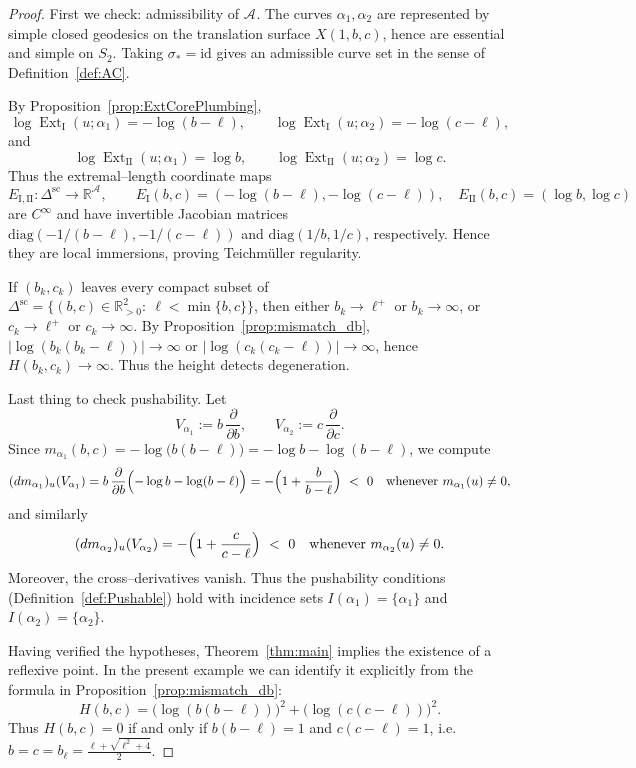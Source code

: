 \documentclass[a4paper,12pt]{amsart}
\newcommand{\R}{\mathbb{R}}
\DeclareMathOperator{\Ext}{Ext}
\newcommand{\id}{\mathrm{id}}
\theoremstyle{plain}
\theoremstyle{definition}
\begin{document}
\begin{proof}
First we check: admissibility of \(\mathcal A_{}\).
The curves \(\alpha_1,\alpha_2\) are represented by simple closed geodesics on the translation surface
\(X(1,b,c)\), hence are essential and simple on \(S_2\).  Taking \(\sigma_\ast=\id\) gives an admissible curve
set in the sense of Definition~\ref{def:AC}.

\smallskip
\noindent

By Proposition~\ref{prop:ExtCorePlumbing},
\[
\log \Ext_{\mathrm{I}}(u;\alpha_1)=-\log(b-\ell),\qquad \log \Ext_{\mathrm{I}}(u;\alpha_2)=-\log(c-\ell),
\]
and
\[
\log \Ext_{\mathrm{II}}(u;\alpha_1)=\log b,\qquad \log \Ext_{\mathrm{II}}(u;\alpha_2)=\log c.
\]
Thus the extremal--length coordinate maps
\[
E_{\mathrm{I, II}}:\Delta^{\mathrm{sc}}_{}\longrightarrow \R^{\mathcal A_{}},
\qquad
E_{\mathrm{I}}(b,c)=(-\log(b-\ell),-\log(c-\ell)),\quad
E_{\mathrm{II}}(b,c)=(\log b,\log c)
\]
are \(C^\infty\) and have invertible Jacobian matrices \(\mathrm{diag}(-1/(b-\ell),-1/(c-\ell))\) and
\(\mathrm{diag}(1/b,1/c)\), respectively.
Hence they are local immersions, proving Teichm\"uller regularity.


\smallskip
\noindent

If \((b_k,c_k)\) leaves every compact subset of \(\Delta^{\mathrm{sc}}_{}=\{(b,c)\in\R_{>0}^2:\ \ell<\min\{b,c\}\}\),
then either \(b_k\longrightarrow \ell^+\) or \(b_k\longrightarrow\infty\), or \(c_k\longrightarrow \ell^+\) or \(c_k\longrightarrow\infty\).
By Proposition~\ref{prop:mismatch_db}, \(\bigl|\log(b_k(b_k-\ell))\bigr|\longrightarrow\infty\) or \(\bigl|\log(c_k(c_k-\ell))\bigr|\longrightarrow\infty\),
hence \(H(b_k,c_k)\longrightarrow\infty\).  Thus the height detects degeneration.

\smallskip
\noindent
Last thing to check pushability. Let
\[
V_{\alpha_1}:=b\,\frac{\partial}{\partial b},
\qquad
V_{\alpha_2}:=c\,\frac{\partial}{\partial c}.
\]
Since \(m_{\alpha_1}(b,c)=-\log\bigl(b(b-\ell)\bigr)=-\log b-\log(b-\ell)\), we compute
\[
(dm_{\alpha_1})_u(V_{\alpha_1})=b\,\frac{\partial}{\partial b}\Bigl(-\log b-\log(b-\ell)\Bigr)
= -\Bigl(1+\frac{b}{b-\ell}\Bigr)\ <\ 0
\quad\text{whenever }m_{\alpha_1}(u)\neq 0,
\]
and similarly
\[
(dm_{\alpha_2})_u(V_{\alpha_2})=
 -\Bigl(1+\frac{c}{c-\ell}\Bigr)\ <\ 0
\quad\text{whenever }m_{\alpha_2}(u)\neq 0.
\]
Moreover, the cross--derivatives vanish.  Thus the pushability conditions
(Definition~\ref{def:Pushable}) hold with incidence sets \(I(\alpha_1)=\{\alpha_1\}\) and \(I(\alpha_2)=\{\alpha_2\}\).

\smallskip
Having verified the hypotheses, Theorem~\ref{thm:main} implies the existence of a reflexive point.
In the present example we can identify it explicitly from the formula in Proposition~\ref{prop:mismatch_db}:
\[
H(b,c)=\bigl(\log(b(b-\ell))\bigr)^2+\bigl(\log(c(c-\ell))\bigr)^2.
\]
Thus \(H(b,c)=0\) if and only if \(b(b-\ell)=1\) and \(c(c-\ell)=1\), i.e.\ \(b=c=b_\ell=\frac{\ell+\sqrt{\ell^2+4}}{2}\).
\end{proof}
\end{document}
